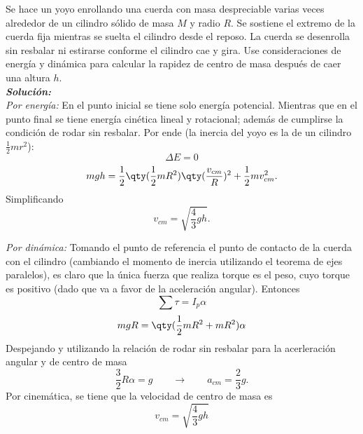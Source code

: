 \begin{mdframed}[style=warning]
	\begin{ejemplo}
		Se hace un yoyo enrollando una cuerda con masa despreciable varias veces alrededor de un cilindro sólido de masa $M$ y radio $R$. Se sostiene el extremo de la cuerda fija mientras se suelta el cilindro desde el reposo. La cuerda se desenrolla sin resbalar ni estirarse conforme el cilindro cae y gira. Use consideraciones de energía y dinámica para calcular la rapidez de centro de masa después de caer una altura $h$. \\[0.5cm]
		\noindent \textit{\textbf{Solución: }} \\
		\textit{Por energía:} En el punto inicial se tiene solo energía potencial. Mientras que en el punto final se tiene energía cinética lineal y rotacional; además de cumplirse la condición de rodar sin resbalar. Por ende (la inercia del yoyo es la de un cilindro $\frac{1}{2} mr^2$):
			$$ \Delta E = 0 $$
			$$ mgh = \frac{1}{2} \qty(\frac{1}{2} mR^2) \qty(\frac{v_{cm}}{R})^2 + \frac{1}{2} mv_{cm} ^2 .  $$
		Simplificando
			$$ \boxed{ v_{cm} = \sqrt{\frac{4}{3} gh}. } $$
			
		\textit{Por dinámica:} Tomando el punto de referencia el punto de contacto de la cuerda con el cilindro (cambiando el momento de inercia utilizando el teorema de ejes paralelos), es claro que la única fuerza que realiza torque es el peso, cuyo torque es positivo (dado que va a favor de la aceleración angular). Entonces
			$$ \sum \tau = I_p \alpha $$
			$$ mgR = \qty(\frac{1}{2} mR^2 + mR^2) \alpha $$
		Despejando y utilizando la relación de rodar sin resbalar para la acerleración angular y de centro de masa
			$$ \frac{3}{2} R\alpha = g \qquad \to \qquad a_{cm} = \frac{2}{3} g. $$
		Por cinemática, se tiene que la velocidad de centro de masa es
			$$ \boxed{ v_{cm} = \sqrt{\frac{4}{3} gh} } $$
	\end{ejemplo}
\end{mdframed}




















